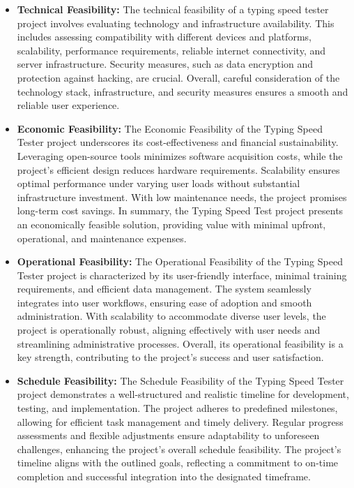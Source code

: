 \begin{itemize}
    \item \textbf{Technical Feasibility: } The technical feasibility of a typing speed tester project involves evaluating technology and infrastructure availability. This includes assessing compatibility with different devices and platforms, scalability, performance requirements, reliable internet connectivity, and server infrastructure. Security measures, such as data encryption and protection against hacking, are crucial. Overall, careful consideration of the technology stack, infrastructure, and security measures ensures a smooth and reliable user experience.


\item \textbf{Economic Feasibility: }The Economic Feasibility of the Typing Speed Tester project underscores its cost-effectiveness and financial sustainability. Leveraging open-source tools minimizes software acquisition costs, while the project's efficient design reduces hardware requirements. Scalability ensures optimal performance under varying user loads without substantial infrastructure investment. With low maintenance needs, the project promises long-term cost savings. In summary, the Typing Speed Test project presents an economically feasible solution, providing value with minimal upfront, operational, and maintenance expenses.

\item \textbf{Operational Feasibility: }The Operational Feasibility of the Typing Speed Tester project is characterized by its user-friendly interface, minimal training requirements, and efficient data management. The system seamlessly integrates into user workflows, ensuring ease of adoption and smooth administration. With scalability to accommodate diverse user levels, the project is operationally robust, aligning effectively with user needs and streamlining administrative processes. Overall, its operational feasibility is a key strength, contributing to the project's success and user satisfaction.
\par

\item \textbf{Schedule Feasibility: }The Schedule Feasibility of the Typing Speed Tester project demonstrates a well-structured and realistic timeline for development, testing, and implementation. The project adheres to predefined milestones, allowing for efficient task management and timely delivery. Regular progress assessments and flexible adjustments ensure adaptability to unforeseen challenges, enhancing the project's overall schedule feasibility. The project's timeline aligns with the outlined goals, reflecting a commitment to on-time completion and successful integration into the designated timeframe.
\end{itemize}
